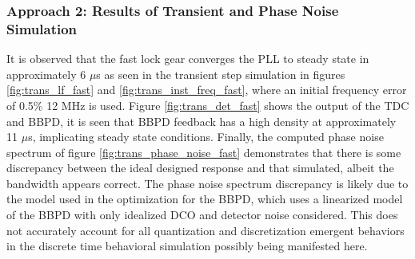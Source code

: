 		\subsubsection{Approach 2: Results of Transient and Phase Noise Simulation}
		It is observed that the fast lock gear converges the PLL to steady state in approximately 6 $\mu$s as seen in the transient step simulation in figures \ref{fig:trans_lf_fast} and \ref{fig:trans_inst_freq_fast}, where an initial frequency error of 0.5\% {12 MHz} is used. Figure \ref{fig:trans_det_fast} shows the output of the TDC and BBPD, it is seen that BBPD feedback has a high density at approximately 11 $\mu$s, implicating steady state conditions. Finally, the computed phase noise spectrum of figure \ref{fig:trans_phase_noise_fast} demonstrates that there is some discrepancy between the ideal designed response and that simulated, albeit the bandwidth appears correct. The phase noise spectrum discrepancy is likely due to the model used in the optimization for the BBPD, which uses a linearized model of the BBPD with only idealized DCO and detector noise considered. This does not accurately account for all quantization and discretization emergent behaviors in the discrete time behavioral simulation possibly being manifested here. 

